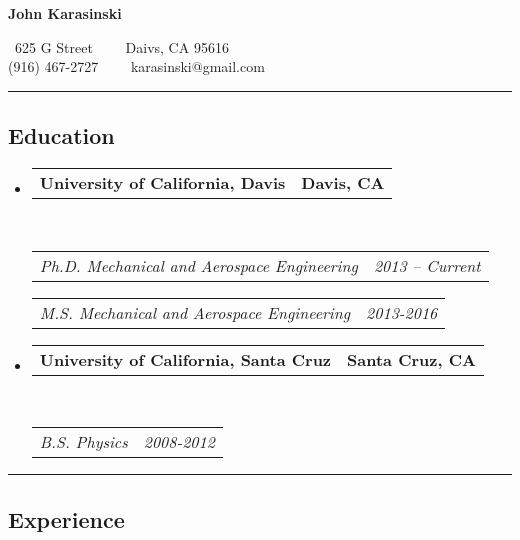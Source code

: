 \documentclass[10pt,letterpaper]{article}
\makeatletter
\newcommand{\headerrow}[2]
{\begin{tabular*}{\linewidth}{l@{\extracolsep{\fill}}r}
	#1 &
	#2 \\
\end{tabular*}}
\makeatother
\begin{document}
\begin{center}
{\LARGE \textbf{John Karasinski}}

\ 625 G Street\ \ \textbullet
\ \ Daivs, CA 95616
\\
(916) 467-2727\ \ \textbullet
\ \ karasinski@gmail.com
\end{center}

\hrule
\vspace{-0.4em}
\subsection*{Education}

\begin{itemize}
	\parskip=0.1em

	\item
	\headerrow
		{\textbf{University of California, Davis}}
		{\textbf{Davis, CA}}
	\\
	\headerrow
		{\emph{Ph.D. Mechanical and Aerospace Engineering}}
		{\emph{2013 -- Current}}

	\headerrow
		{\emph{M.S. Mechanical and Aerospace Engineering}}
		{\emph{2013-2016}}

	\item
	\headerrow
		{\textbf{University of California, Santa Cruz}}
		{\textbf{Santa Cruz, CA}}
	\\
	\headerrow
		{\emph{B.S. Physics}}
		{\emph{2008-2012}}
\end{itemize}

\hrule
\vspace{-0.4em}
\subsection*{Experience}
\end{document}
